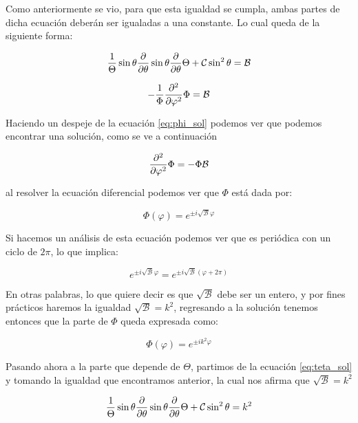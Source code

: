\documentclass[11pt]{report}
\theoremstyle{plain}
\theoremstyle{definition}
\begin{document}
Como anteriormente se vio, para que esta igualdad se cumpla, ambas partes de dicha ecuación deberán ser igualadas a una constante. Lo cual queda de la siguiente forma:

\begin{equation}
	\label{eq:teta_sol}
	\frac{1}{\Theta}\sin\theta\pdv{\theta}\sin\theta	\pdv{\theta}\Theta+\mathcal{C}\sin^2\theta = \mathcal{B}
\end{equation}

\begin{equation}
	\label{eq:phi_sol}
	- \frac{1}{\Phi}\pdv[2]{\varphi}\Phi = \mathcal{B}
\end{equation}

Haciendo un despeje de la ecuación \ref{eq:phi_sol} podemos ver que podemos encontrar una solución, como se ve a continuación

\begin{equation*}
	\pdv[2]{\varphi}\Phi = -\Phi\mathcal{B}
\end{equation*}

al resolver la ecuación diferencial podemos ver que $\Phi$ está dada por:

\begin{equation*}
	\Phi(\varphi) = e^{\pm i\sqrt{\mathcal{B}}\varphi}
\end{equation*}

Si hacemos un análisis de esta ecuación podemos ver que es periódica con un ciclo de $2\pi$, lo que implica:

\begin{equation*}
	e^{\pm i\sqrt{\mathcal{B}}\varphi} = e^{\pm i\sqrt{\mathcal{B}}(\varphi+2\pi)}
\end{equation*}

En otras palabras, lo que quiere decir es que $\sqrt{\mathcal{B}}$ debe ser un entero, y por fines prácticos haremos la igualdad $\sqrt{\mathcal{B}} = k^2$, regresando a la solución tenemos entonces que la parte de $\Phi$ queda expresada como:

\begin{equation*}
	\Phi(\varphi) = e^{\pm ik^2\varphi}
\end{equation*}

Pasando ahora a la parte que depende de $\Theta$, partimos de la ecuación \ref{eq:teta_sol} y tomando la igualdad que encontramos anterior, la cual nos afirma que $\sqrt{\mathcal{B}} = k^2$

\begin{equation*}
	\frac{1}{\Theta}\sin\theta\pdv{\theta}\sin\theta	\pdv{\theta}\Theta+\mathcal{C}\sin^2\theta = k^2
\end{equation*}
\end{document}
